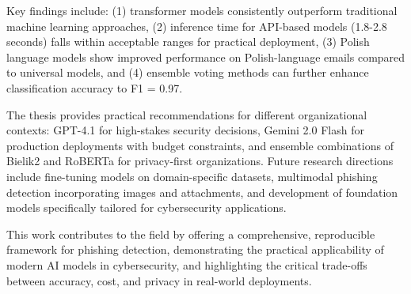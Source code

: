 \documentclass[11pt]{extreport}
\begin{document}
Key findings include: (1) transformer models consistently outperform traditional machine learning approaches, (2) inference time for API-based models (1.8-2.8 seconds) falls within acceptable ranges for practical deployment, (3) Polish language models show improved performance on Polish-language emails compared to universal models, and (4) ensemble voting methods can further enhance classification accuracy to F1 = 0.97.

The thesis provides practical recommendations for different organizational contexts: GPT-4.1 for high-stakes security decisions, Gemini 2.0 Flash for production deployments with budget constraints, and ensemble combinations of Bielik2 and RoBERTa for privacy-first organizations. Future research directions include fine-tuning models on domain-specific datasets, multimodal phishing detection incorporating images and attachments, and development of foundation models specifically tailored for cybersecurity applications.

This work contributes to the field by offering a comprehensive, reproducible framework for phishing detection, demonstrating the practical applicability of modern AI models in cybersecurity, and highlighting the critical trade-offs between accuracy, cost, and privacy in real-world deployments.
\end{document}
